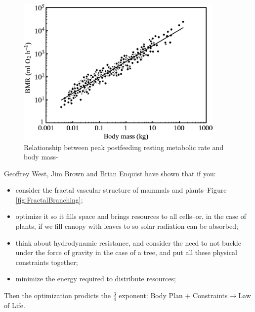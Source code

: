 \documentclass[]{article}
\begin{document}
\begin{figure}[H]
	\caption[Relationship between BMR and body mass]{Relationship between peak postfeeding resting metabolic rate and body mass-\cite{white2005allometric}}\label{fig:allometric:scaling}
	\includegraphics[width=0.9\textwidth]{WhiteSeymour}
\end{figure}

Geoffrey West, Jim Brown and Brian Enquist\cite{west1997general} have shown that if you: \begin{itemize}
	\item consider the fractal vascular structure of mammals and plants--Figure \ref{fig:FractalBranching};
	\item optimize it so it fills space and brings resources to all cells--or, in the case of plants, if we  fill canopy with leaves to so solar radiation can be absorbed;
	\item think about hydrodynamic resistance, and consider the need to not buckle under the force of gravity in the case of a tree, and put all these physical constraints together;
	\item minimize the energy required to distribute resources;
\end{itemize}
Then the optimization prodicts the $\frac{3}{4}$ exponent: Body Plan + Constraints$\rightarrow$Law of Life.
\end{document}
